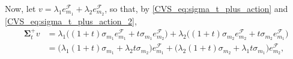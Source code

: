 \documentclass[twoside,11pt]{book}
\numberwithin{theorem}{chapter}
\numberwithin{definition}{chapter}
\numberwithin{proposition}{chapter}
\numberwithin{corollary}{chapter}
\numberwithin{example}{chapter}
\numberwithin{lemma}{chapter}
\numberwithin{assumption}{chapter}
\begin{document}
Now, let $v = \lambda_{1} e_{m_{1}}^{\mathcal{F}} + \lambda_{2} e_{m_{2}}^{\mathcal{F}}$, so that, by \eqref{CVS_eq:sigma_t_plus_action} and \eqref{CVS_eq:sigma_t_plus_action_2},
\begin{align}
\bm{\Sigma}_{t}^{+} v & = \lambda_{1} \bigg((1+t) \sigma_{m_{1}} e_{m_{1}}^{\mathcal{F}} + t \sigma_{m_{1}}  e_{m_{2}}^{\mathcal{F}} \bigg) + \lambda_{2} \bigg((1+t) \sigma_{m_{2}} e_{m_{2}}^{\mathcal{F}}  + t \sigma_{m_{2}}  e_{m_{1}}^{\mathcal{F}} \bigg) \nonumber \\
\label{CVS_eq:sigma_t_plus_action_v}
& = \bigg( \lambda_{1} (1+t) \sigma_{m_{1}} + \lambda_{2} t \sigma_{m_{2}} \bigg) e_{m_{1}}^{\mathcal{F}} + \bigg( \lambda_{2} (1+t) \sigma_{m_{2}} + \lambda_{1}t\sigma_{m_{1}} \bigg) e_{m_{2}} ^{\mathcal{F}},
\end{align}
\end{document}
